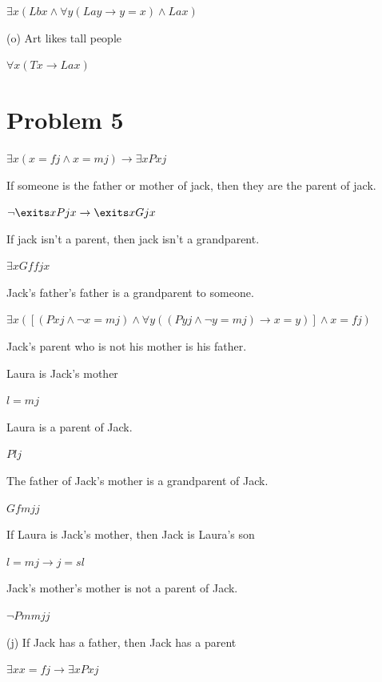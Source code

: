 \documentclass[12pt]{article}
\begin{document}
$\exists x (Lbx \land \forall y (Lay \rightarrow y = x) \land Lax)$

(o) Art likes tall people 

$\forall x (Tx \rightarrow Lax)$

\section*{Problem 5}

$\exists x (x = fj \land x = mj) \rightarrow \exists x Pxj$

If someone is the father or mother of jack, then they are the parent of jack. 

$\lnot \exits x Pjx \rightarrow \exits x Gjx$

If jack isn't a parent, then jack isn't a grandparent. 

$\exists xGffjx$

Jack's father's father is a grandparent to someone.  

$\exists x([(Pxj \land \lnot x = mj) \land \forall y((Pyj \land \lnot y = mj) \rightarrow x = y)] \land x = fj) $

Jack's parent who is not his mother is his father. 

Laura is Jack’s mother 

$l = mj$

Laura is a parent of Jack. 

$Plj$

The father of Jack’s mother is a grandparent of Jack. 

$Gfmjj$

If Laura is Jack’s mother, then Jack is Laura’s son 

$l = mj \rightarrow j = sl$

Jack’s mother’s mother is not a parent of Jack. 

$\lnot Pmmjj$ 

(j) If Jack has a father, then Jack has a parent

$\exists x x = fj \rightarrow \exists x Pxj$
\end{document}

